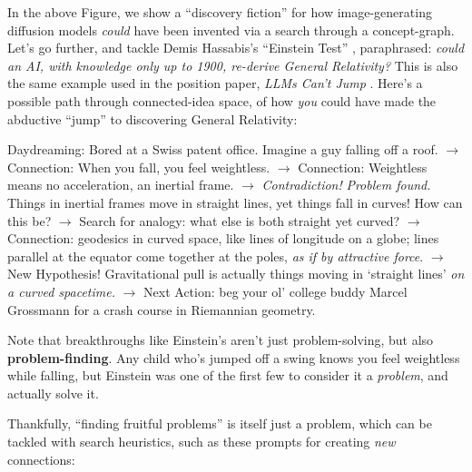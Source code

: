 \documentclass[11pt]{article}
\renewenvironment{quote}
  {\begin{tcolorbox}[enhanced, breakable, sharp corners, frame hidden,
     colback=quotebg, borderline west={3pt}{0pt}{quotebar},
     left=8pt, right=8pt, top=5pt, bottom=5pt,
     before upper={\setlength{\parskip}{0.6em}}]}
  {\end{tcolorbox}}
\begin{document}
In the above Figure, we show a ``discovery fiction'' \citep{nielsen_discovery_fiction} for how image-generating diffusion models \citep{sohl_dickstein_diffusion,ddpm} \textit{could} have been invented via a search through a concept-graph. Let's go further, and tackle Demis Hassabis's ``Einstein Test'' \citep{hassabis_lex_fridman}, paraphrased: \textit{could an AI, with knowledge only up to 1900, re-derive General Relativity?} This is also the same example used in the position paper, \textit{LLMs Can't Jump} \citep{llms_cant_jump}. Here's a possible path through connected-idea space, of how \textit{you} could have made the abductive ``jump'' to discovering General Relativity:
\begin{quote}
Daydreaming: Bored at a Swiss patent office. Imagine a guy falling off a roof. $\to$ Connection: When you fall, you feel weightless. $\to$ Connection: Weightless means no acceleration, an inertial frame. $\to$ \textit{Contradiction!} \textit{Problem found.} Things in inertial frames move in straight lines, yet things fall in curves! How can this be? $\to$ Search for analogy: what else is both straight yet curved? $\to$ Connection: geodesics in curved space, like lines of longitude on a globe; lines parallel at the equator come together at the poles, \textit{as if by attractive force}. $\to$ New Hypothesis! Gravitational pull is actually things moving in `straight lines' \textit{on a curved spacetime.} $\to$ Next Action: beg your ol' college buddy Marcel Grossmann for a crash course in Riemannian geometry.
\end{quote}
Note that breakthroughs like Einstein's aren't just problem-solving, but also \textbf{problem-finding}. Any child who's jumped off a swing knows you feel weightless while falling, but Einstein was one of the first few to consider it a \textit{problem}, and actually solve it.

Thankfully, ``finding fruitful problems'' is itself just a problem, which can be tackled with search heuristics, such as these prompts for creating \textit{new} connections:
\end{document}
